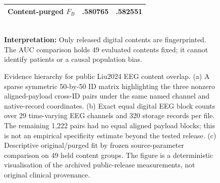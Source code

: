 \begin{figure}[tb]
\begin{minipage}[t]{.46\linewidth}
{{\begin{tabular}{@{}lcc@{}}
Content-purged $F_B$ & .580765 & .582551\\
\bottomrule
\end{tabular}}}\\[7pt]
{\small\textbf{Interpretation:} Only released digital contents are
fingerprinted. The AUC comparison holds 49 evaluated contents fixed;
it cannot identify patients or a causal population bias.}
\end{minipage}
\caption{Evidence hierarchy for public Liu2024 EEG content overlap.
(a) A sparse symmetric 50-by-50 ID matrix highlighting the three
nonzero aligned-payload cross-ID pairs under the same named channel
and native-record coordinates. (b) Exact equal digital EEG block
counts over 29 time-varying EEG channels and 320 storage records
per file. The remaining 1,222 pairs had no equal aligned payload
blocks; this is not an empirical specificity estimate beyond
the tested release. (c) Descriptive original/purged fit by frozen
source-parameter comparison on 49 held content groups.
The figure is a deterministic visualisation of the archived
public-release measurements, not original clinical provenance.}
\label{fig:p2-native-evidence-matrix}
\end{figure}
